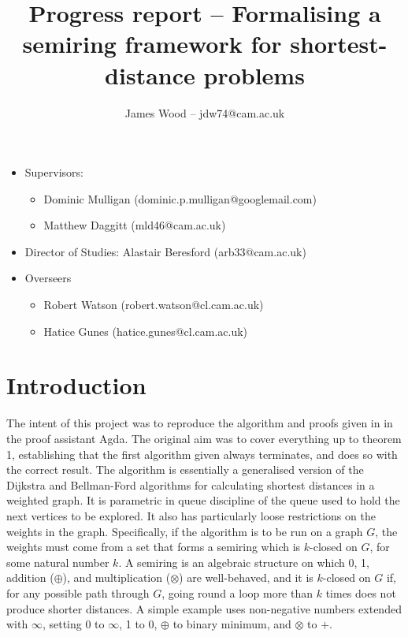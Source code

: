 \documentclass{article}
\begin{document}
\title{Progress report -- Formalising a semiring framework for shortest-distance problems}
\author{James Wood -- jdw74@cam.ac.uk}
\maketitle

\begin{itemize}
  \item Supervisors:
    \begin{itemize}
      \item Dominic Mulligan (dominic.p.mulligan@googlemail.com)
      \item Matthew Daggitt (mld46@cam.ac.uk)
    \end{itemize}
  \item Director of Studies: Alastair Beresford (arb33@cam.ac.uk)
  \item Overseers
    \begin{itemize}
      \item Robert Watson (robert.watson@cl.cam.ac.uk)
      \item Hatice Gunes (hatice.gunes@cl.cam.ac.uk)
    \end{itemize}
\end{itemize}

\section{Introduction}
The intent of this project was to reproduce the algorithm and proofs given in \cite{Mohri02} in the proof assistant Agda\cite{Norell07}.
The original aim was to cover everything up to theorem 1, establishing that the first algorithm given always terminates, and does so with the correct result.
The algorithm is essentially a generalised version of the Dijkstra and Bellman-Ford algorithms for calculating shortest distances in a weighted graph.
It is parametric in queue discipline of the queue used to hold the next vertices to be explored.
It also has particularly loose restrictions on the weights in the graph.
Specifically, if the algorithm is to be run on a graph $G$, the weights must come from a set that forms a semiring which is $k$-closed on $G$, for some natural number $k$.
A semiring is an algebraic structure on which 0, 1, addition ($\oplus$), and multiplication ($\otimes$) are well-behaved, and it is $k$-closed on $G$ if, for any possible path through $G$, going round a loop more than $k$ times does not produce shorter distances.
A simple example uses non-negative numbers extended with $\infty$, setting 0 to $\infty$, 1 to $0$, $\oplus$ to binary minimum, and $\otimes$ to $+$.
\end{document}
